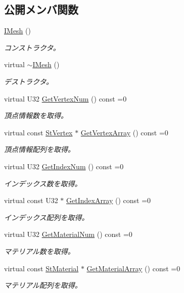 \subsection*{公開メンバ関数}
\begin{DoxyCompactItemize}
\item 
\hyperlink{class_i_mesh_a39bf278a127fe4a317c53e8e0dd66d32}{I\+Mesh} ()
\begin{DoxyCompactList}\small\item\em コンストラクタ。 \end{DoxyCompactList}\item 
virtual \hyperlink{class_i_mesh_a1227ad691cc829ef540b3ff956019423}{$\sim$\+I\+Mesh} ()
\begin{DoxyCompactList}\small\item\em デストラクタ。 \end{DoxyCompactList}\item 
virtual U32 \hyperlink{class_i_mesh_a98ac2c9b1da3c22191e4198833a4f6ef}{Get\+Vertex\+Num} () const  =0
\begin{DoxyCompactList}\small\item\em 頂点情報数を取得。 \end{DoxyCompactList}\item 
virtual const \hyperlink{struct_i_mesh_1_1_st_vertex}{St\+Vertex} $\ast$ \hyperlink{class_i_mesh_a91d4b99a5a91cb54d364cc6a8342b187}{Get\+Vertex\+Array} () const  =0
\begin{DoxyCompactList}\small\item\em 頂点情報配列を取得。 \end{DoxyCompactList}\item 
virtual U32 \hyperlink{class_i_mesh_a580358c71d8766c1e0aa8037b51a9296}{Get\+Index\+Num} () const  =0
\begin{DoxyCompactList}\small\item\em インデックス数を取得。 \end{DoxyCompactList}\item 
virtual const U32 $\ast$ \hyperlink{class_i_mesh_a3a9e9207cfae24ae1dd62eb2d2356301}{Get\+Index\+Array} () const  =0
\begin{DoxyCompactList}\small\item\em インデックス配列を取得。 \end{DoxyCompactList}\item 
virtual U32 \hyperlink{class_i_mesh_a1b8922bc90cd0951062053e24287ad6c}{Get\+Material\+Num} () const  =0
\begin{DoxyCompactList}\small\item\em マテリアル数を取得。 \end{DoxyCompactList}\item 
virtual const \hyperlink{struct_i_mesh_1_1_st_material}{St\+Material} $\ast$ \hyperlink{class_i_mesh_a48afb85120e333b50ac9de73b8b60d16}{Get\+Material\+Array} () const  =0
\begin{DoxyCompactList}\small\item\em マテリアル配列を取得。 \end{DoxyCompactList}\end{DoxyCompactItemize}


